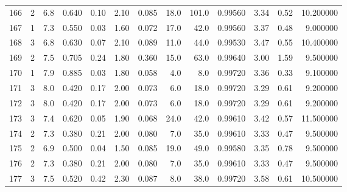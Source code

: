 \begin{tabular}{lrrrrrrrrrrrr}
166  &        2 &            6.8 &             0.640 &         0.10 &            2.10 &      0.085 &                 18.0 &                 101.0 &  0.99560 &  3.34 &       0.52 &  10.200000 \\
167  &        1 &            7.3 &             0.550 &         0.03 &            1.60 &      0.072 &                 17.0 &                  42.0 &  0.99560 &  3.37 &       0.48 &   9.000000 \\
168  &        3 &            6.8 &             0.630 &         0.07 &            2.10 &      0.089 &                 11.0 &                  44.0 &  0.99530 &  3.47 &       0.55 &  10.400000 \\
169  &        2 &            7.5 &             0.705 &         0.24 &            1.80 &      0.360 &                 15.0 &                  63.0 &  0.99640 &  3.00 &       1.59 &   9.500000 \\
170  &        1 &            7.9 &             0.885 &         0.03 &            1.80 &      0.058 &                  4.0 &                   8.0 &  0.99720 &  3.36 &       0.33 &   9.100000 \\
171  &        3 &            8.0 &             0.420 &         0.17 &            2.00 &      0.073 &                  6.0 &                  18.0 &  0.99720 &  3.29 &       0.61 &   9.200000 \\
172  &        3 &            8.0 &             0.420 &         0.17 &            2.00 &      0.073 &                  6.0 &                  18.0 &  0.99720 &  3.29 &       0.61 &   9.200000 \\
173  &        3 &            7.4 &             0.620 &         0.05 &            1.90 &      0.068 &                 24.0 &                  42.0 &  0.99610 &  3.42 &       0.57 &  11.500000 \\
174  &        2 &            7.3 &             0.380 &         0.21 &            2.00 &      0.080 &                  7.0 &                  35.0 &  0.99610 &  3.33 &       0.47 &   9.500000 \\
175  &        2 &            6.9 &             0.500 &         0.04 &            1.50 &      0.085 &                 19.0 &                  49.0 &  0.99580 &  3.35 &       0.78 &   9.500000 \\
176  &        2 &            7.3 &             0.380 &         0.21 &            2.00 &      0.080 &                  7.0 &                  35.0 &  0.99610 &  3.33 &       0.47 &   9.500000 \\
177  &        3 &            7.5 &             0.520 &         0.42 &            2.30 &      0.087 &                  8.0 &                  38.0 &  0.99720 &  3.58 &       0.61 &  10.500000 \\

\end{tabular}
